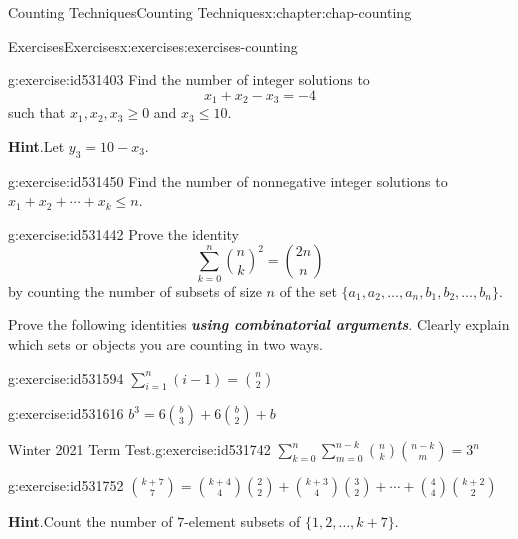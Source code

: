 \documentclass[oneside,10pt,]{book}
\newcommand{\blocktitlefont}{\relax}
\newcommand{\alert}[1]{\textbf{\textit{#1}}}
\numberwithin{equation}{section}
\begin{document}
\begin{chapterptx}{Counting Techniques}{}{Counting Techniques}{}{}{x:chapter:chap-counting}
\begin{exercises-section}{Exercises}{}{Exercises}{}{}{x:exercises:exercises-counting}
\begin{divisionexercise}{24}{}{}{g:exercise:id531403}
Find the number of integer solutions to%
\begin{equation*}
x_1 + x_2 - x_3 = -4
\end{equation*}
such that \(x_1, x_2, x_3 \geq 0\) and \(x_3 \leq 10\).%
\par\smallskip%
\noindent\textbf{\blocktitlefont Hint}.\hypertarget{g:hint:id531454}{}\quad{}Let \(y_3 = 10 - x_3\).%
\end{divisionexercise}%
\begin{divisionexercise}{25}{}{}{g:exercise:id531450}%
Find the number of nonnegative integer solutions to \(x_1 + x_2 + \cdots + x_k \leq n\).%
\end{divisionexercise}%
\begin{divisionexercise}{26}{}{}{g:exercise:id531442}%
Prove the identity%
\begin{equation*}
\sum_{k=0}^n \binom{n}{k}^2 = \binom{2n}{n}
\end{equation*}
by counting the number of subsets of size \(n\) of the set \(\{a_1,a_2,\ldots,a_n,b_1,b_2,\ldots,b_n\}\).%
\end{divisionexercise}%
\par\medskip\noindent%
%
Prove the following identities \alert{using combinatorial arguments}. Clearly explain which sets or objects you are counting in two ways.%
\begin{exercisegroup}
\begin{divisionexerciseeg}{27}{}{}{g:exercise:id531594}%
\(\displaystyle\sum_{i=1}^n (i-1) = \binom{n}{2}\)%
\end{divisionexerciseeg}%
\begin{divisionexerciseeg}{28}{}{}{g:exercise:id531616}%
\(\displaystyle b^3 = 6\binom{b}{3} + 6\binom{b}{2} + b\)%
\end{divisionexerciseeg}%
\begin{divisionexerciseeg}{29}{Winter 2021 Term Test.}{}{g:exercise:id531742}%
\(\displaystyle \sum_{k=0}^n\sum_{m=0}^{n-k} \binom{n}{k} \binom{n-k}{m} = 3^n \)%
\end{divisionexerciseeg}%
\begin{divisionexerciseeg}{30}{}{}{g:exercise:id531752}%
\(\displaystyle \binom{k+7}{7} = \binom{k+4}{4} \binom{2}{2} + \binom{k+3}{4}\binom{3}{2} + \cdots + \binom{4}{4}\binom{k+2}{2} \)%
\par\smallskip%
\noindent\textbf{\blocktitlefont Hint}.\hypertarget{g:hint:id531754}{}\quad{}Count the number of \(7\)-element subsets of \(\{1,2,\ldots,k+7\}\).%
\end{divisionexerciseeg}%
\end{exercisegroup}
\par\medskip\noindent
\end{exercises-section}
\end{chapterptx}
\end{document}
